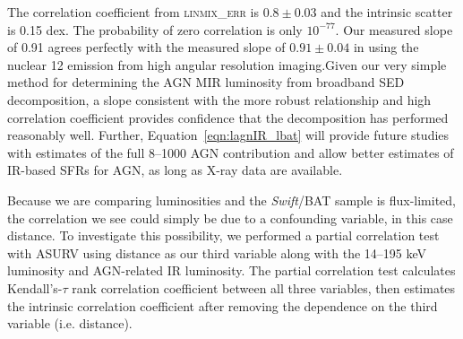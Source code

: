 \documentclass[fleqn, usenatbib]{mnras}
\newcommand{\swift}{\textit{Swift}}
\begin{document}


The correlation coefficient from \textsc{linmix\_err} is $0.8\pm0.03$ and the intrinsic scatter is 0.15 dex. The probability of zero correlation is only $10^{-77}$. {\color{red}Our measured slope of 0.91 agrees perfectly with the measured slope of $0.91\pm0.04$ in \citet{Asmus:2015qy} using the nuclear 12 \micron{} emission from high angular resolution imaging.}Given our very simple method for determining the AGN MIR luminosity from broadband SED decomposition, a slope consistent with the more robust \citet{Asmus:2015qy} relationship and high correlation coefficient provides confidence that the decomposition has performed reasonably well. Further, Equation~\ref{eqn:lagnIR_lbat} will provide future studies with estimates of the full 8--1000 \micron{} AGN contribution and allow better estimates of IR-based SFRs for AGN, as long as X-ray data are available.

Because we are comparing luminosities and the \swift/BAT sample is flux-limited, the correlation we see could simply be due to a confounding variable, in this case distance. To investigate this possibility, we performed a partial correlation test with ASURV using distance as our third variable along with the 14--195 keV luminosity and AGN-related IR luminosity. The partial correlation test calculates Kendall's-$\tau$ rank correlation coefficient between all three variables, then estimates the intrinsic correlation coefficient after removing the dependence on the third variable (i.e. distance). 
\end{document}
